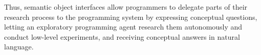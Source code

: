 Thus, semantic object interfaces allow programmers to delegate parts of their research process to the programming system by expressing conceptual questions, letting an exploratory programming agent research them autonomously and conduct low-level experiments, and receiving conceptual answers in natural language.
